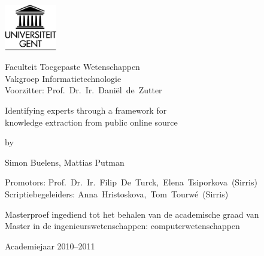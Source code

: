 \documentclass{book}
\begin{document}
\begin{center}

\includegraphics[height=2cm]{fig/ruglogo}

\vspace{0.5cm}

Faculteit Toegepaste Wetenschappen\\
Vakgroep Informatietechnologie\\
Voorzitter: Prof.~Dr.~Ir.~Dani\"{e}l~de~Zutter

\vspace{3.5cm}

\fontsize{17.28pt}{21pt}
\selectfont

Identifying experts through a framework for\\
knowledge extraction from public online source

\fontsize{12pt}{14pt}
\selectfont

\vspace{.6cm}

by 

\vspace{.4cm}

Simon Buelens, Mattias Putman

\vspace{3.5cm}

Promotors: Prof.~Dr.~Ir.~Filip~De~Turck,~Elena~Tsiporkova~(Sirris)\\
Scriptiebegeleiders: Anna~Hristoskova,~Tom~Tourw\'{e}~(Sirris)\\

\vspace{2cm}

Masterproef ingediend tot het behalen van de academische graad van\\
Master in de ingenieurswetenschappen: computerwetenschappen

\vspace{1cm}

Academiejaar 2010--2011

\end{center}
\end{document}
